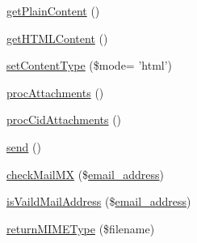 \begin{DoxyCompactItemize}
\item 
\hyperlink{classMail_ac1a5a2b325a14e6331f13d2b2b18d9f8}{get\+Plain\+Content} ()
\item 
\hyperlink{classMail_a74db66148c78f2e732a3f2797b108eae}{get\+H\+T\+M\+L\+Content} ()
\item 
\hyperlink{classMail_adc8e047b6acd8b183bac7082180cb18f}{set\+Content\+Type} (\$mode= 'html')
\item 
\hyperlink{classMail_a136e94d3b4ae6cea8944cf05f58754ce}{proc\+Attachments} ()
\item 
\hyperlink{classMail_a185f66ac96139a53251ede273a120d13}{proc\+Cid\+Attachments} ()
\item 
\hyperlink{classMail_a6520941b529c223c1b59ec7544f7f7d6}{send} ()
\item 
\hyperlink{classMail_a0bdfc629861cf1048ac189d61fd57ef4}{check\+Mail\+M\+X} (\$\hyperlink{ko_8install_8php_a1dffea0d5ba8194f8ef01f414af0c831}{email\+\_\+address})
\item 
\hyperlink{classMail_a2d7fd899ae79dc18e7804a044127dbac}{is\+Vaild\+Mail\+Address} (\$\hyperlink{ko_8install_8php_a1dffea0d5ba8194f8ef01f414af0c831}{email\+\_\+address})
\item 
\hyperlink{classMail_afe036d54e43919318cb8e081533e7b90}{return\+M\+I\+M\+E\+Type} (\$filename)
\end{DoxyCompactItemize}
